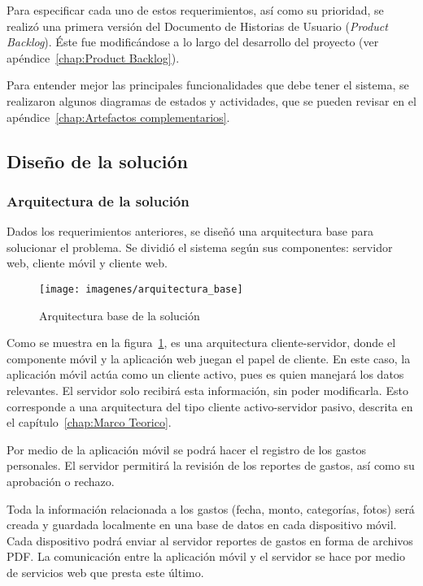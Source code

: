 Para especificar cada uno de estos requerimientos, así como su prioridad, se realizó una primera versión del Documento de Historias de Usuario (\textit{Product Backlog}). Éste fue modificándose a lo largo del desarrollo del proyecto (ver apéndice~\ref{chap:Product Backlog}).

Para entender mejor las principales funcionalidades que debe tener el sistema, se realizaron algunos diagramas de estados y actividades, que se pueden revisar en el apéndice~\ref{chap:Artefactos complementarios}.

\subsection{Diseño de la solución}

\subsubsection{Arquitectura de la solución} \label{section:Arquitectura base}

Dados los requerimientos anteriores, se diseñó una arquitectura base para solucionar el problema. Se dividió el sistema según sus componentes: servidor web, cliente móvil y cliente web. 

\begin{figure}[ht]
  \centering
  \texttt{[image: imagenes/arquitectura\_base]}
  \caption{Arquitectura base de la solución}
  \label{fig:arquitecturaBase}
\end{figure}

Como se muestra en la figura~\ref{fig:arquitecturaBase}, es una arquitectura cliente-servidor, donde el componente móvil y la aplicación web juegan el papel de cliente. En este caso, la aplicación móvil actúa como un cliente activo, pues es quien manejará los datos relevantes. El servidor solo recibirá esta información, sin poder modificarla. Esto corresponde a una arquitectura del tipo cliente activo-servidor pasivo, descrita en el capítulo~\ref{chap:Marco Teorico}.

Por medio de la aplicación móvil se podrá hacer el registro de los gastos personales. El servidor permitirá la revisión de los reportes de gastos, así como su aprobación o rechazo.

Toda la información relacionada a los gastos (fecha, monto, categorías, fotos) será creada y guardada localmente en una base de datos en cada dispositivo móvil. Cada dispositivo podrá enviar al servidor reportes de gastos en forma de archivos PDF. La comunicación entre la aplicación móvil y el servidor se hace por medio de servicios web que presta este último.

